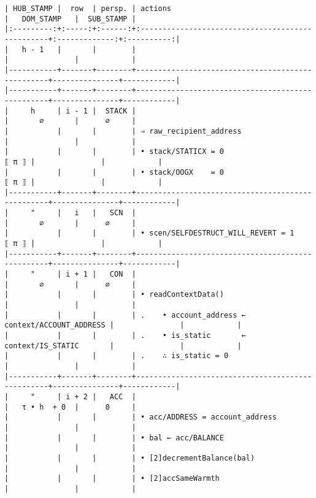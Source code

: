 \documentclass[varwidth=\maxdimen,margin=0.5cm,multi={verbatim}]{standalone}
\begin{document}
\begin{verbatim}
| HUB_STAMP |  row  | persp. | actions                                          |   DOM_STAMP   |  SUB_STAMP |
|:---------:+:-----:+:------:+:-------------------------------------------------+:-------------:+:----------:|
|   h - 1   |       |        |                                                  |               |            |
|-----------+-------+--------+--------------------------------------------------+---------------+------------|
|-----------+-------+--------+--------------------------------------------------+---------------+------------|
|     h     | i - 1 |  STACK |                                                  |       ∅       |      ∅     |
|           |       |        | ⇒ raw_recipient_address                          |               |            |
|           |       |        | • stack/STATICX = 0                        ⟦ π ⟧ |               |            |
|           |       |        | • stack/OOGX    = 0                        ⟦ π ⟧ |               |            |
|-----------+-------+--------+--------------------------------------------------+---------------+------------|
|     "     |   i   |   SCN  |                                                  |       ∅       |      ∅     |
|           |       |        | • scen/SELFDESTRUCT_WILL_REVERT = 1        ⟦ π ⟧ |               |            |
|-----------+-------+--------+--------------------------------------------------+---------------+------------|
|     "     | i + 1 |   CON  |                                                  |       ∅       |      ∅     |
|           |       |        | • readContextData()                              |               |            |
|           |       |        | .    • account_address ← context/ACCOUNT_ADDRESS |               |            |
|           |       |        | .    • is_static       ← context/IS_STATIC       |               |            |
|           |       |        | .    ∴ is_static = 0                             |               |            |
|-----------+-------+--------+--------------------------------------------------+---------------+------------|
|     "     | i + 2 |   ACC  |                                                  |   τ • h  + 0  |      0     |
|           |       |        | • acc/ADDRESS = account_address                  |               |            |
|           |       |        | • bal ← acc/BALANCE                              |               |            |
|           |       |        | • [2]decrementBalance(bal)                       |               |            |
|           |       |        | • [2]accSameWarmth                               |               |            |

\end{verbatim}
\end{document}
